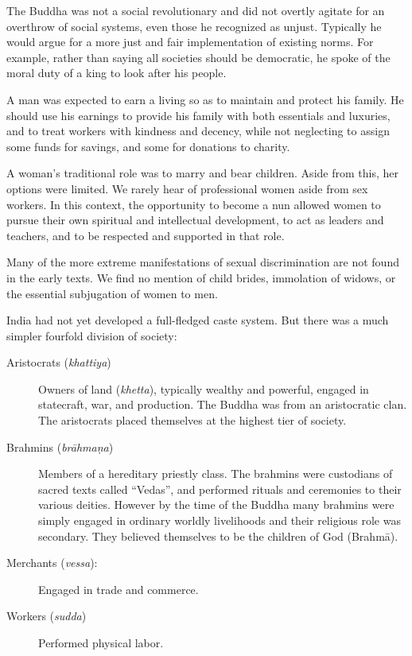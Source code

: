 \documentclass[12pt,openany]{book}%
\begin{document}
The Buddha was not a social revolutionary and did not overtly agitate for an overthrow of social systems, even those he recognized as unjust. Typically he would argue for a more just and fair implementation of existing norms. For example, rather than saying all societies should be democratic, he spoke of the moral duty of a king to look after his people.

A man was expected to earn a living so as to maintain and protect his family. He should use his earnings to provide his family with both essentials and luxuries, and to treat workers with kindness and decency, while not neglecting to assign some funds for savings, and some for donations to charity.

A woman’s traditional role was to marry and bear children. Aside from this, her options were limited. We rarely hear of professional women aside from sex workers. In this context, the opportunity to become a nun allowed women to pursue their own spiritual and intellectual development, to act as leaders and teachers, and to be respected and supported in that role.

Many of the more extreme manifestations of sexual discrimination are not found in the early texts. We find no mention of child brides, immolation of widows, or the essential subjugation of women to men.

India had not yet developed a full-fledged caste system. But there was a much simpler fourfold division of society:

\begin{description}%
\item[Aristocrats (\textit{khattiya})] Owners of land (\textit{khetta}), typically wealthy and powerful, engaged in statecraft, war, and production. The Buddha was from an aristocratic clan. The aristocrats placed themselves at the highest tier of society.%
\item[Brahmins (\textit{\textsanskrit{brāhmaṇa}})] Members of a hereditary priestly class. The brahmins were custodians of sacred texts called “Vedas”, and performed rituals and ceremonies to their various deities. However by the time of the Buddha many brahmins were simply engaged in ordinary worldly livelihoods and their religious role was secondary. They believed themselves to be the children of God (\textsanskrit{Brahmā}).%
\item[Merchants (\textit{vessa}):] Engaged in trade and commerce.%
\item[Workers (\textit{sudda})] Performed physical labor.%
\end{description}
\end{document}
